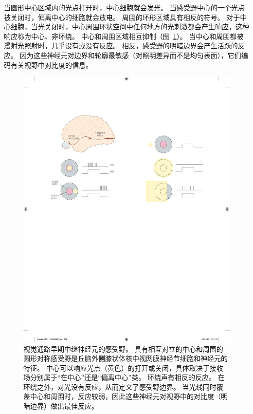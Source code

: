当圆形中心区域内的光点打开时，中心细胞就会发光。
当感受野中心的一个光点被关闭时，偏离中心的细胞就会放电。
周围的环形区域具有相反的符号。 
对于中心细胞，当光关闭时，中心周围环状空间中任何地方的光刺激都会产生响应，这种响应称为中心、非环绕。 
中心和周围区域相互抑制（图~\ref{fig:21_9}）。
当中心和周围都被漫射光照射时，几乎没有或没有反应。 
相反，感受野的明暗边界会产生活跃的反应。
因为这些神经元对边界和轮廓最敏感（对照明差异而不是均匀表面），它们编码有关视野中对比度的信息。


\begin{figure}[htbp]
	\centering
	\includegraphics[width=1.0\linewidth]{chap21/fig_21_9}
	\caption{视觉通路早期中继神经元的感受野。
		具有相互对立的中心和周围的圆形对称感受野是丘脑外侧膝状体核中视网膜神经节细胞和神经元的特征。
		中心可以响应光点（黄色）的打开或关闭，具体取决于接收场分别属于“在中心”还是“偏离中心”类。
		环绕声有相反的反应。
		在环绕之外，对光没有反应，从而定义了感受野边界。
		当光线同时覆盖中心和周围时，反应较弱，因此这些神经元对视野中的对比度（明暗边界）做出最佳反应。}
	\label{fig:21_9}
\end{figure}


